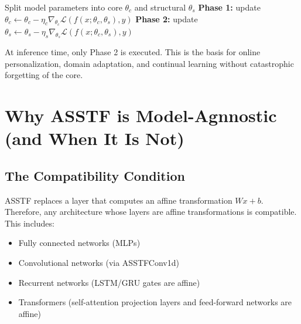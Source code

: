 \documentclass[11pt,a4paper]{article}
\theoremstyle{definition}
\begin{document}
\begin{algorithm}[H]
\caption{ASSTF Bilevel Training (one epoch)}
\label{alg:bilevel}
\begin{algorithmic}[1]
\State Split model parameters into core $\theta_c$ and structural $\theta_s$
    \State \textbf{Phase 1:} update $\theta_c \leftarrow \theta_c - \eta_c \nabla_{\theta_c} \mathcal{L}(f(x; \theta_c, \theta_s), y)$
    \State \textbf{Phase 2:} update $\theta_s \leftarrow \theta_s - \eta_s \nabla_{\theta_s} \mathcal{L}(f(x; \theta_c, \theta_s), y)$
\EndFor
\end{algorithmic}
\end{algorithm}

At inference time, only Phase 2 is executed. This is the basis for online personalization, domain adaptation, and continual learning without catastrophic forgetting of the core.

\section{Why ASSTF is Model-Agnnostic (and When It Is Not)}
\label{sec:universality}

\subsection{The Compatibility Condition}
\label{subsec:compatibility}

ASSTF replaces a layer that computes an affine transformation $W x + b$. Therefore, any architecture whose layers are affine transformations is compatible. This includes:

\begin{itemize}
    \item Fully connected networks (MLPs)
    \item Convolutional networks (via ASSTFConv1d)
    \item Recurrent networks (LSTM/GRU gates are affine)
    \item Transformers (self-attention projection layers and feed-forward networks are affine)
\end{itemize}
\end{document}
